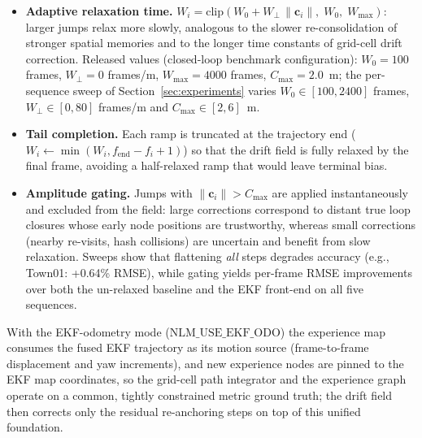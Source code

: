 \begin{itemize}
    \item \textbf{Adaptive relaxation time.} $W_i = \mathrm{clip}(W_0 + W_{\perp}\,\lVert\mathbf{c}_i\rVert,\; W_0,\; W_{\max})$: larger jumps relax more slowly, analogous to the slower re-consolidation of stronger spatial memories and to the longer time constants of grid-cell drift correction. Released values (closed-loop benchmark configuration): $W_0 = 100$ frames, $W_{\perp} = 0$ frames/m, $W_{\max} = 4000$ frames, $C_{\max} = 2.0$~m; the per-sequence sweep of Section~\ref{sec:experiments} varies $W_0 \in [100, 2400]$ frames, $W_{\perp} \in [0, 80]$ frames/m and $C_{\max} \in [2, 6]$~m.
    \item \textbf{Tail completion.} Each ramp is truncated at the trajectory end ($W_i \leftarrow \min(W_i, f_{\mathrm{end}}-f_i+1)$) so that the drift field is fully relaxed by the final frame, avoiding a half-relaxed ramp that would leave terminal bias.
    \item \textbf{Amplitude gating.} Jumps with $\lVert\mathbf{c}_i\rVert > C_{\max}$ are applied instantaneously and excluded from the field: large corrections correspond to distant true loop closures whose early node positions are trustworthy, whereas small corrections (nearby re-visits, hash collisions) are uncertain and benefit from slow relaxation. Sweeps show that flattening \emph{all} steps degrades accuracy (e.g., Town01: +0.64\% RMSE), while gating yields per-frame RMSE improvements over both the un-relaxed baseline and the EKF front-end on all five sequences.
\end{itemize}
With the EKF-odometry mode ($\mathrm{NLM\_USE\_EKF\_ODO}$) the experience map consumes the fused EKF trajectory as its motion source (frame-to-frame displacement and yaw increments), and new experience nodes are pinned to the EKF map coordinates, so the grid-cell path integrator and the experience graph operate on a common, tightly constrained metric ground truth; the drift field then corrects only the residual re-anchoring steps on top of this unified foundation.


